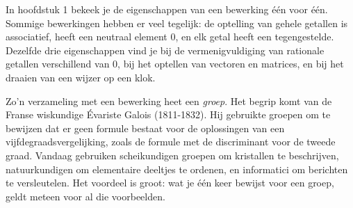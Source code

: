 %



In hoofdstuk 1 bekeek je de eigenschappen van een bewerking één voor één. Sommige bewerkingen hebben er veel tegelijk: de optelling van gehele getallen is associatief, heeft een neutraal element 0, en elk getal heeft een tegengestelde. Dezelfde drie eigenschappen vind je bij de vermenigvuldiging van rationale getallen verschillend van 0, bij het optellen van vectoren en matrices, en bij het draaien van een wijzer op een klok.

Zo'n verzameling met een bewerking heet een \textit{groep}. Het begrip komt van de Franse wiskundige Évariste Galois (1811-1832). Hij gebruikte groepen om te bewijzen dat er geen formule bestaat voor de oplossingen van een vijfdegraadsvergelijking, zoals de formule met de discriminant voor de tweede graad. Vandaag gebruiken scheikundigen groepen om kristallen te beschrijven, natuurkundigen om elementaire deeltjes te ordenen, en informatici om berichten te versleutelen. Het voordeel is groot: wat je één keer bewijst voor een groep, geldt meteen voor al die voorbeelden.

\begin{oefeningen}[Start]

\end{oefeningen}



